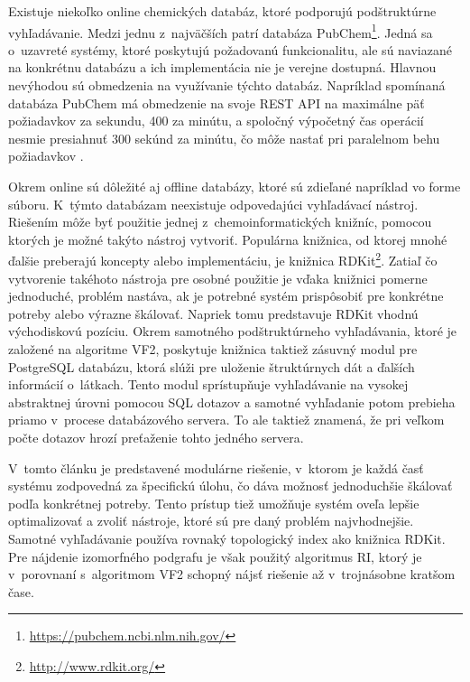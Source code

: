 \documentclass[slovak]{ExcelAtFIT} %
\begin{document}
Existuje niekoľko online chemických databáz, kto\-ré podporujú podštruktúrne vyhľadávanie. Medzi jednu z~najväčších patrí databáza PubChem\footnote{\url{https://pubchem.ncbi.nlm.nih.gov/}}. Jedná sa o~uzavreté systémy, ktoré poskytujú požadovanú funkcionalitu, ale sú naviazané na konkrétnu databázu a ich implementácia nie je verejne dostupná. Hlavnou ne\-vý\-ho\-dou sú obmedzenia na využívanie týchto databáz. Napríklad spomínaná databáza PubChem má obmedzenie na svoje REST API na maximálne päť požiadavkov za sekundu, 400 za minútu, a spoločný výpočetný čas operácií nesmie presiahnuť 300 sekúnd za minútu, čo môže nastať pri paralelnom behu po\-žia\-dav\-kov \cite{pubchem_limits}. 

Okrem online sú dôležité aj offline databázy, ktoré sú zdieľané napríklad vo forme súboru. K~týmto databázam neexistuje odpovedajúci vyhľadávací nástroj. Riešením môže byť použitie jednej z~chemoinformatických knižníc, pomocou ktorých je možné takýto nástroj vytvoriť. Populárna knižnica, od ktorej mnohé ďalšie preberajú koncepty alebo implementáciu, je knižnica RDKit\footnote{\url{http://www.rdkit.org/}}. Zatiaľ čo vytvorenie takéhoto ná\-stro\-ja pre osobné použitie je vďaka knižnici pomerne jednoduché, problém nastáva, ak je potrebné systém pri\-spô\-so\-biť pre konkrétne potreby alebo výrazne škálovať. Napriek tomu predstavuje RDKit vhodnú východiskovú pozíciu. Okrem samotného podštruktúrneho vy\-hľa\-dá\-va\-nia, ktoré je založené na algoritme VF2, poskytuje knižnica taktiež zásuvný modul pre PostgreSQL databázu, ktorá slúži pre uloženie štruktúrnych dát a ďalších informácií o~látkach. Tento modul sprístupňuje vyhľadávanie na vysokej abstraktnej úrovni pomocou SQL dotazov a samotné vyhľadanie potom prebieha priamo v~procese databázového servera. To ale taktiež znamená, že pri veľkom počte dotazov hrozí preťaženie tohto jedného servera.

V~tomto článku je predstavené modulárne riešenie, v~ktorom je každá časť systému zodpovedná za špe\-ci\-fi\-ckú úlohu, čo dáva možnosť jednoduchšie škálovať podľa konkrétnej potreby. Tento prístup tiež umožňuje systém oveľa lepšie optimalizovať a zvoliť nástroje, ktoré sú pre daný problém najvhodnejšie. Samotné vyhľadávanie používa rovnaký topologický index ako knižnica RDKit. Pre nájdenie izomorfného podgrafu je však použitý algoritmus RI, ktorý je v~porovnaní s~algoritmom VF2 schopný nájsť riešenie až v~trojnásobne kratšom čase. 
\end{document}
